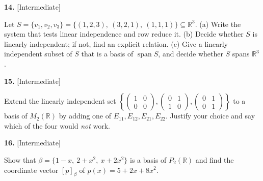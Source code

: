 \documentclass[11pt]{article}
\begin{document}
\begin{minipage}{\linewidth}\textbf{14.} \hfill{\scriptsize\color{ink}[Intermediate]}\par\nopagebreak Let $S=\{v_1,v_2,v_3\}=\{(1,2,3),\ (3,2,1),\ (1,1,1)\}\subseteq\mathbb{R}^{3}$. (a) Write the system that tests linear independence and row reduce it. (b) Decide whether $S$ is linearly independent; if not, find an explicit relation. (c) Give a linearly independent subset of $S$ that is a basis of $\operatorname{span}S$, and decide whether $S$ spans $\mathbb{R}^{3}$.
\vspace{5.4cm}\end{minipage}\par\vspace{4pt}
\begin{minipage}{\linewidth}\textbf{15.} \hfill{\scriptsize\color{ink}[Intermediate]}\par\nopagebreak Extend the linearly independent set $\left\{\begin{pmatrix}1&0\\0&0\end{pmatrix},\begin{pmatrix}0&1\\1&0\end{pmatrix},\begin{pmatrix}0&1\\0&1\end{pmatrix}\right\}$ to a basis of $M_2(\mathbb{R})$ by adding one of $E_{11},E_{12},E_{21},E_{22}$. Justify your choice and say which of the four would \emph{not} work.
\vspace{5.7cm}\end{minipage}\par\vspace{4pt}
\begin{minipage}{\linewidth}\textbf{16.} \hfill{\scriptsize\color{ink}[Intermediate]}\par\nopagebreak Show that $\beta=\{1-x,\ 2+x^{2},\ x+2x^{2}\}$ is a basis of $P_2(\mathbb{R})$ and find the coordinate vector $[p]_\beta$ of $p(x)=5+2x+8x^{2}$.
\vspace{5.4cm}\end{minipage}\par\vspace{4pt}
\end{document}
